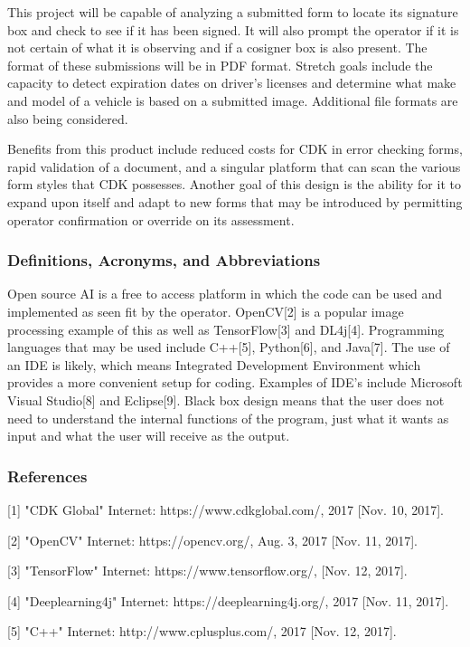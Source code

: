 \documentclass[article, onecolumn, draftclsnofoot,10pt, compsoc]{IEEEtran}
\begin{document}
This project will be capable of analyzing a submitted form to locate its signature box and check to see if it has been signed. It will also prompt the operator if it is not certain of what it is observing and if a cosigner box is also present. The format of these submissions will be in PDF format. Stretch goals include the capacity to detect expiration dates on driver’s licenses and determine what make and model of a vehicle is based on a submitted image. Additional file formats are also being considered.

Benefits from this product include reduced costs for CDK in error checking forms, rapid validation of a document, and a singular platform that can scan the various form styles that CDK possesses. Another goal of this design is the ability for it to expand upon itself and adapt to new forms that may be introduced by permitting operator confirmation or override on its assessment. 

\subsubsection{Definitions, Acronyms, and Abbreviations}
Open source AI is a free to access platform in which the code can be used and implemented as seen fit by the operator. OpenCV[2] is a popular image processing example of this as well as TensorFlow[3] and DL4j[4]. Programming languages that may be used include C++[5], Python[6], and Java[7]. The use of an IDE is likely, which means Integrated Development Environment which provides a more convenient setup for coding. Examples of IDE’s include Microsoft Visual Studio[8] and Eclipse[9]. Black box design means that the user does not need to understand the internal functions of the program, just what it wants as input and what the user will receive as the output. 

\subsubsection{References}
[1] "CDK Global" Internet: https://www.cdkglobal.com/, 2017 [Nov. 10, 2017].

[2] "OpenCV" Internet: https://opencv.org/, Aug. 3, 2017 [Nov. 11, 2017].

[3] "TensorFlow" Internet: https://www.tensorflow.org/, [Nov. 12, 2017].

[4] "Deeplearning4j" Internet: https://deeplearning4j.org/, 2017 [Nov. 11, 2017].

[5] "C++" Internet: http://www.cplusplus.com/, 2017 [Nov. 12, 2017].
\end{document}
